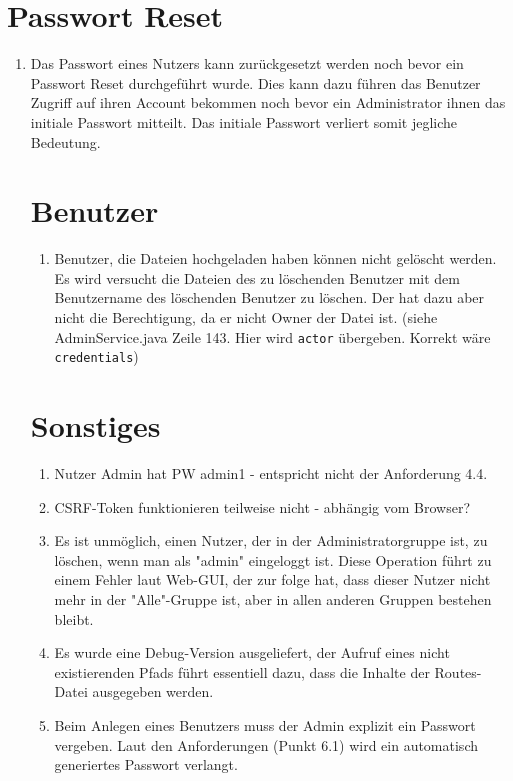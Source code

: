 \documentclass[12pt,DIV14,BCOR10mm,a4paper,parskip=half-,headsepline,headinclude,english,ngerman,bibliography=totocnumbered]{scrreprt}
\begin{document}
 \section{Passwort Reset}
\begin{enumerate}
 \item Das Passwort eines Nutzers kann zurückgesetzt werden noch bevor ein Passwort Reset durchgeführt wurde. Dies kann dazu führen das Benutzer Zugriff auf ihren Account bekommen noch bevor ein Administrator ihnen das initiale Passwort mitteilt. Das initiale Passwort verliert somit jegliche Bedeutung.
 

\section{Benutzer}
\begin{enumerate}

  \item Benutzer, die Dateien hochgeladen haben können nicht gelöscht werden. Es wird versucht die Dateien des zu löschenden Benutzer mit dem Benutzername des löschenden Benutzer zu löschen. Der hat dazu aber nicht die Berechtigung, da er nicht Owner der Datei ist. (siehe AdminService.java Zeile 143. Hier wird \texttt{actor} übergeben. Korrekt wäre \texttt{credentials})
 \end{enumerate}


\section{Sonstiges}

\begin{enumerate} 

  \item Nutzer Admin hat PW admin1 - entspricht nicht der Anforderung 4.4.
  \item CSRF-Token funktionieren teilweise nicht - abhängig vom Browser?
  \item Es ist unmöglich, einen Nutzer, der in der Administratorgruppe ist, zu löschen, wenn man als "admin" eingeloggt ist. Diese Operation führt zu einem Fehler laut Web-GUI, der zur folge hat, dass dieser Nutzer nicht mehr in der "Alle"-Gruppe ist, aber in allen anderen Gruppen bestehen bleibt.
  \item Es wurde eine Debug-Version ausgeliefert, der Aufruf eines nicht existierenden Pfads führt essentiell dazu, dass die Inhalte der Routes-Datei ausgegeben werden.
  \item Beim Anlegen eines Benutzers muss der Admin explizit ein Passwort vergeben. Laut den Anforderungen (Punkt 6.1) wird ein automatisch generiertes Passwort verlangt.


\end{enumerate}
\end{enumerate}
\end{document}
